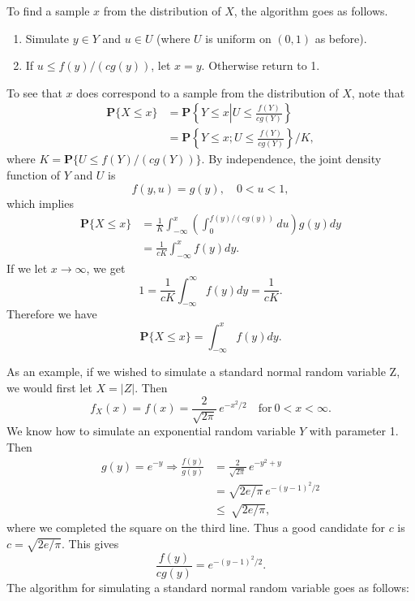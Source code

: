 \documentclass{stml-l}
\theoremstyle{definition}
\numberwithin{equation}{chapter}
\numberwithin{figure}{chapter}
\numberwithin{figure}{section}
\begin{document}
To find a sample $x$ from the distribution of $X$, the algorithm
goes as follows.
\begin{enumerate}
\item Simulate $y\in Y$ and $u\in U$
(where $U$ is uniform on $(0,1)$ as before).
\item If $u\leq
f(y)/(cg(y))$, let $x=y$. Otherwise return to 1.
\end{enumerate}
To see that $x$ does correspond to a sample from the distribution of $X$, note that
\begin{align*}
\mathbf{P}\{X\leq x\}&=\mathbf{P}\left\{Y\leq
x\left|U\leq\frac{f(Y)}{cg(Y)}\right.\right\}\\
&=\mathbf{P}\left\{Y\leq x;U\leq\frac{f(Y)}{cg(Y)}\right\}/K,
\end{align*}
where $K=\mathbf{P}\{U\leq f(Y)/(cg(Y))\}$. By independence, the
joint density function of $Y$ and $U$ is
\begin{equation*}
f(y,u)=g(y),\quad 0<u<1,
\end{equation*}
which implies
\begin{align*}
\mathbf{P}\{X\leq x\}&=\frac{1}{K}\int_{-\infty}^{x}\left(\int_{0}^{f(y)/(cg(y))}du\right)g(y)dy\\
&=\frac{1}{cK}\int_{-\infty}^{x}f(y)dy.
\end{align*}
If we let $ x\rightarrow\infty$, we get
\begin{equation*}
1=\frac{1}{cK}\int_{-\infty}^{\infty}f(y)dy=\frac{1}{cK}.
\end{equation*}
Therefore we have
\begin{equation*}
\mathbf{P}\{X\leq x\}=\int_{-\infty}^{x}f(y)dy.
\end{equation*}

As an example, if we wished to simulate a standard normal random
variable $\mathrm{Z}$, we would first let $X=|Z|$. Then
\begin{equation*}
f_{X}(x)=f(x)=\frac{2}{\sqrt{2\pi}}\,e^{-x^{2}/2}\quad \mathrm{for}\
0<x<\infty.
\end{equation*}
We know how to simulate an exponential random variable $Y$ with
parameter 1. Then
\begin{align*}
g(y)=e^{-y}\Rightarrow\frac{f(y)}{g(y)}&=\frac{2}{\sqrt{2\pi}}\,e^{-y^{2}+y}\\
&=\sqrt{2e/\pi}\,e^{-(y-1)^{2}/2}\\
&\leq\ \sqrt{2e/\pi},
\end{align*}
where we completed the square on the third line. Thus a good candidate for $c$ is $ c=\sqrt{2e/\pi}$. This gives
\begin{equation*}
\frac{f(y)}{cg(y)}=e^{-(y-1)^{2}/2}.
\end{equation*}
The algorithm for simulating a standard normal random variable goes as follows:
\end{document}
